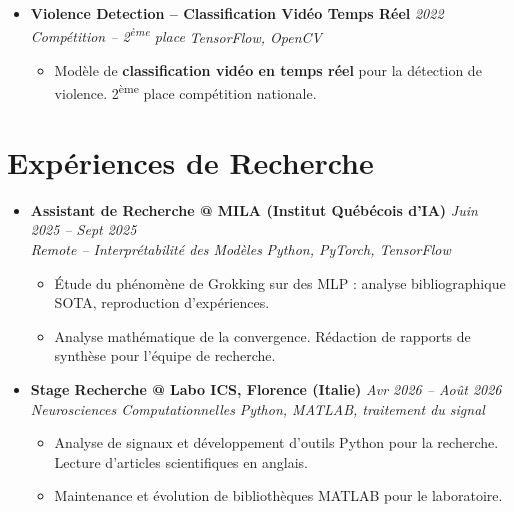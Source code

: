 \documentclass[a4paper,11pt]{article}
\begin{document}
\begin{itemize}[leftmargin=*, label={-}]
\item \textbf{Violence Detection -- Classification Vidéo Temps Réel} \hfill \textit{2022} \\
\textit{Compétition -- 2\textsuperscript{ème} place} \hfill \textit{TensorFlow, OpenCV}
\vspace{-2pt}
    \begin{itemize}[leftmargin=0.4cm, nosep, label=\tiny$\bullet$]
        \item \small{Modèle de \textbf{classification vidéo en temps réel} pour la détection de violence. 2\textsuperscript{ème} place compétition nationale.}
    \end{itemize}
\vspace{3pt}

\end{itemize}

\section{Expériences de Recherche}
\begin{itemize}[leftmargin=*, label={-}]

\item \textbf{Assistant de Recherche @ MILA (Institut Québécois d'IA)} \hfill \textit{Juin 2025 -- Sept 2025} \\
\textit{Remote -- Interprétabilité des Modèles} \hfill \textit{Python, PyTorch, TensorFlow}
\vspace{-2pt}
    \begin{itemize}[leftmargin=0.4cm, nosep, label=\tiny$\bullet$]
        \item \small{Étude du phénomène de Grokking sur des MLP : analyse bibliographique SOTA, reproduction d'expériences.}
        \item \small{Analyse mathématique de la convergence. Rédaction de rapports de synthèse pour l'équipe de recherche.}
    \end{itemize}
\vspace{3pt}

\item \textbf{Stage Recherche @ Labo ICS, Florence (Italie)} \hfill \textit{Avr 2026 -- Août 2026} \\
\textit{Neurosciences Computationnelles} \hfill \textit{Python, MATLAB, traitement du signal}
\vspace{-2pt}
    \begin{itemize}[leftmargin=0.4cm, nosep, label=\tiny$\bullet$]
        \item \small{Analyse de signaux et développement d'outils Python pour la recherche. Lecture d'articles scientifiques en anglais.}
        \item \small{Maintenance et évolution de bibliothèques MATLAB pour le laboratoire.}
    \end{itemize}
\vspace{3pt}

\end{itemize}
\end{document}

